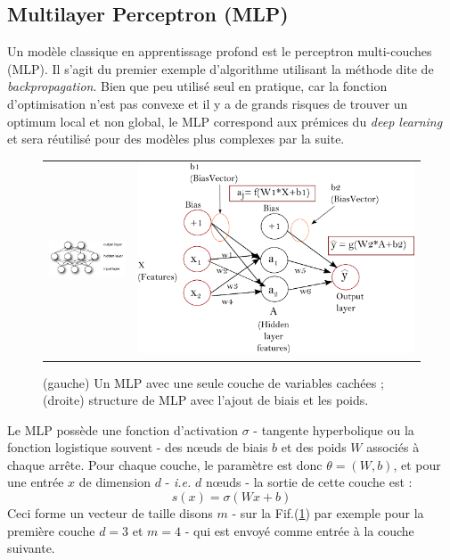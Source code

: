 \documentclass[10pt,a4paper]{article}
\begin{document}
\subsection{Multilayer Perceptron (MLP)}

Un modèle classique en apprentissage profond est le perceptron multi-couches (MLP). Il s'agit du premier exemple d'algorithme utilisant la méthode dite de \emph{backpropagation}. Bien que peu utilisé seul en pratique, car la fonction d'optimisation n'est pas convexe et il y a de grands risques de trouver un optimum local et non global, le MLP correspond aux prémices du \emph{deep learning} et sera réutilisé pour des modèles plus complexes par la suite.

\begin{figure}[ht!]
\centering
\begin{tabular}{cc}
\includegraphics[width = .5\columnwidth]{fig/mlp} &
\includegraphics[width = .5\columnwidth]{fig/backprop_notation.png} 
\end{tabular}
\caption{(gauche) Un MLP avec une seule couche de variables cachées ; (droite) structure de MLP avec l'ajout de biais et les poids.}
\label{fig2}
\end{figure}

Le MLP possède une fonction d'activation $\sigma$ - tangente hyperbolique ou la fonction logistique souvent - des nœuds de biais $b$ et des poids $W$ associés à chaque arrête. Pour chaque couche, le paramètre est donc $\theta = (W,b)$, et pour une entrée $x$ de dimension $d$ - \emph{i.e.} $d$ nœuds - la sortie de cette couche est : 
\begin{equation}
s(x) = \sigma(Wx + b)
\end{equation}
Ceci forme un vecteur de taille disons $m$ - sur la Fif.(\ref{fig2}) par exemple pour la première couche $d=3$ et $m=4$ - qui est envoyé comme entrée à la couche suivante. 
\end{document}
